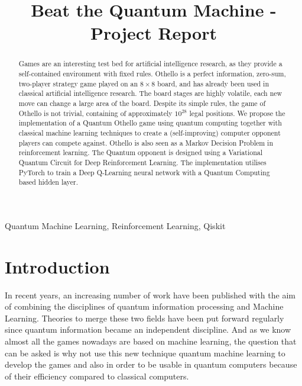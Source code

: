 \documentclass[conference]{IEEEtran}
\begin{document}
\title{Beat the Quantum Machine - Project Report\\
}

\author{

}

\maketitle

\begin{abstract}
Games are an interesting test bed for artificial intelligence research, as they provide a self-contained environment with fixed rules. Othello is a perfect information, zero-sum, two-player strategy game played on an $8\times8$ board, and has already been used in classical artificial intelligence research. The board stages are highly volatile, each new move can change a large area of the board. Despite its simple rules, the game of Othello is not trivial, containing of approximately $10^{28}$ legal positions. We propose the implementation of a Quantum Othello game using quantum computing together with classical machine
learning techniques to create a (self-improving) computer opponent players can compete against. Othello is also seen as a Markov Decision Problem in reinforcement learning. The Quantum opponent is designed using a Variational Quantum Circuit for Deep Reinforcement Learning. The implementation utilises PyTorch to train a Deep Q-Learning neural network with a Quantum Computing based hidden layer.
\\ 
\end{abstract}

\begin{IEEEkeywords}
Quantum Machine Learning, Reinforcement Learning, Qiskit
\end{IEEEkeywords}

\section{Introduction}
In recent years, an increasing number of work have been published with the aim of combining the disciplines of quantum information processing and Machine Learning. Theories to merge these two fields have been put forward regularly since quantum information became an independent discipline.
And as we know almost all the games nowadays are based on machine learning, the question that can be asked is why not use this new technique quantum machine learning to develop the games and also in order to be usable in quantum computers because of their efficiency compared to classical computers.
\\ 
\end{document}
